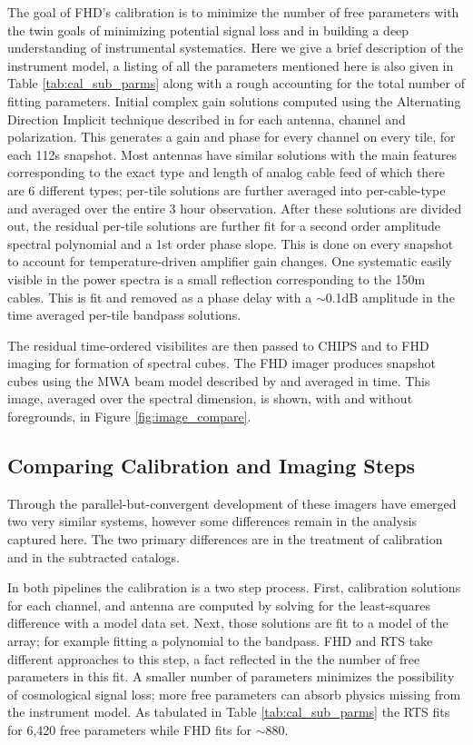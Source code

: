 \documentclass[twolcolumn]{emulateapj}
\begin{document}
The goal of FHD's calibration is to minimize the number of free parameters with the twin goals of minimizing potential signal loss and in building a deep understanding of instrumental systematics. Here we give a brief description of the instrument model, a listing of all the parameters mentioned here is also given in Table \ref{tab:cal_sub_parms} along with a rough accounting for the total number of fitting parameters. Initial complex gain solutions computed using the Alternating Direction Implicit technique described in \citet{sal14} for each antenna, channel and polarization.  This generates a gain and phase for every channel on every tile, for each 112s snapshot.  Most antennas have similar solutions with the main features corresponding to the exact type and length of analog cable feed of which there are 6 different types; per-tile solutions are further averaged into per-cable-type and averaged over the entire 3 hour observation. After these solutions are divided out, the residual per-tile solutions are further fit for a second order amplitude spectral polynomial and a 1st order phase slope. This is done on every snapshot to account for temperature-driven amplifier gain changes. 
One systematic easily visible in the power spectra is a small reflection corresponding to the 150m cables. This is fit and removed as a phase delay with a $\sim$0.1dB amplitude in the time averaged per-tile bandpass solutions.


The residual time-ordered visibilites are then passed to CHIPS and to FHD imaging for formation of spectral cubes.  The FHD imager  produces snapshot cubes using the MWA beam model described by \cite{Sutinjo:2015RaSc...50...52S} and averaged in time. This image, averaged over the spectral dimension, is shown, with and without foregrounds, in Figure \ref{fig:image_compare}.

\subsection{Comparing Calibration and Imaging Steps}
\label{sec:comparing_imaging}
Through the parallel-but-convergent development of these imagers have emerged two very similar systems, however some differences remain in the analysis captured here. The two primary differences are in the treatment of calibration and in the subtracted catalogs.  

In both pipelines the calibration is a two step process. First, calibration solutions for each channel, and antenna are computed by solving for the least-squares difference with a model data set. Next, those solutions are fit to a model of the array; for example fitting a polynomial to the bandpass. FHD and RTS take different approaches to this step, a fact reflected in the the number of free parameters in this fit. A smaller number of parameters minimizes the possibility of cosmological signal loss; more free parameters can absorb physics missing from the instrument model.  As tabulated in Table \ref{tab:cal_sub_parms} the RTS fits for 6,420 free parameters while FHD fits for $\sim$880.  
\end{document}
